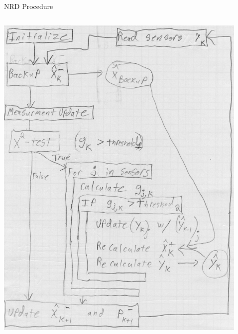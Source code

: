 \documentclass[aspectratio=169]{beamer}
\begin{document}
\begin{frame}{NRD Procedure}
	\begin{columns}
		\begin{column}{0.35\textwidth}
			\includegraphics[width=\columnwidth]{Images/NRD_Diagram}
		\end{column}
		\begin{column}{0.05\textwidth}\end{column}
		\begin{column}{0.45\textwidth}

\end{column}
\end{columns}
\end{frame}
\end{document}
